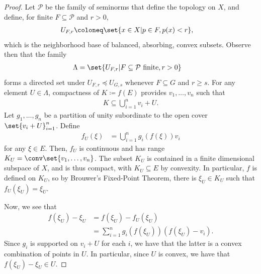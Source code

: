 \documentclass[10pt]{mypackage}
\begin{document}
\begin{proof}
  Let $\mathcal{P}$ be the family of seminorms that define the topology on $X$, and define, for finite $F\subseteq \mathcal{P}$ and $r > 0$,
  \begin{align*}
    U_{F,r} &\coloneq \set{x\in X | p\in F,p(x) < r},
  \end{align*}
  which is the neighborhood base of balanced, absorbing, convex subsets. Observe then that the family
  \begin{align*}
    \Lambda &= \set{U_{F,r} | F\subseteq \mathcal{P}\text{ finite},r > 0}
  \end{align*}
  forms a directed set under $U_{F,r}\preceq U_{G,s}$ whenever $F\subseteq G$ and $r \geq s$. For any element $U\in \Lambda$, compactness of $K\coloneq f(E)$ provides $v_1,\dots,v_n$ such that
  \begin{align*}
    K\subseteq \bigcup_{i=1}^{n} v_i + U.
  \end{align*}
  Let $g_1,\dots,g_n$ be a partition of unity subordinate to the open cover $\set{v_i + U}_{i=1}^{n}$. Define
  \begin{align*}
    f_U(\xi) &= \bigcup_{i=1}^{n} g_i\left( f\left( \xi \right) \right) v_i
  \end{align*}
  for any $\xi\in E$. Then, $f_U$ is continuous and has range $K_U = \conv\set{v_1,\dots,v_n}$. The subset $K_U$ is contained in a finite dimensional subspace of $X$, and is thus compact, with $K_U\subseteq E$ by convexity. In particular, $f$ is defined on $K_U$, so by Brouwer's Fixed-Point Theorem, there is $\xi_U\in K_U$ such that $f_U\left( \xi_U \right) = \xi_U$.

  Now, we see that
  \begin{align*}
    f\left( \xi_U \right) - \xi_U &= f\left( \xi_U \right) - f_U\left( \xi_U \right)\\
                                  &= \sum_{i=1}^{n} g_i\left( f\left( \xi_U \right) \right)\left( f\left( \xi_U \right) - v_i \right).
  \end{align*}
  Since $g_i$ is supported on $v_i + U$ for each $i$, we have that the latter is a convex combination of points in $U$. In particular, since $U$ is convex, we have that $f\left( \xi_U \right) - \xi_U\in U$.


\end{proof}
\end{document}
